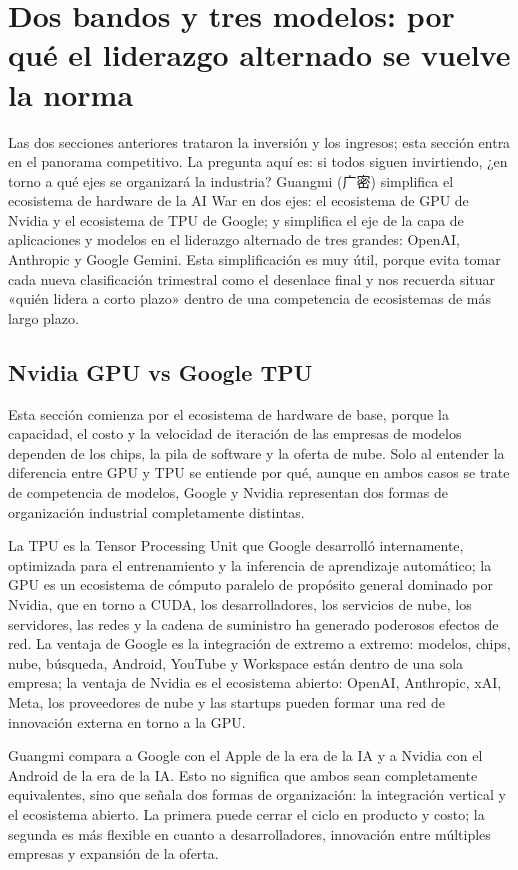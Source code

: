 \section{Dos bandos y tres modelos: por qué el liderazgo alternado se vuelve la norma}

Las dos secciones anteriores trataron la inversión y los ingresos; esta sección entra en el panorama competitivo. La pregunta aquí es: si todos siguen invirtiendo, ¿en torno a qué ejes se organizará la industria? Guangmi (广密) simplifica el ecosistema de hardware de la AI War en dos ejes: el ecosistema de GPU de Nvidia y el ecosistema de TPU de Google; y simplifica el eje de la capa de aplicaciones y modelos en el liderazgo alternado de tres grandes: OpenAI, Anthropic y Google Gemini. Esta simplificación es muy útil, porque evita tomar cada nueva clasificación trimestral como el desenlace final y nos recuerda situar «quién lidera a corto plazo» dentro de una competencia de ecosistemas de más largo plazo.

\subsection{Nvidia GPU vs Google TPU}

Esta sección comienza por el ecosistema de hardware de base, porque la capacidad, el costo y la velocidad de iteración de las empresas de modelos dependen de los chips, la pila de software y la oferta de nube. Solo al entender la diferencia entre GPU y TPU se entiende por qué, aunque en ambos casos se trate de competencia de modelos, Google y Nvidia representan dos formas de organización industrial completamente distintas.

La TPU es la Tensor Processing Unit que Google desarrolló internamente, optimizada para el entrenamiento y la inferencia de aprendizaje automático; la GPU es un ecosistema de cómputo paralelo de propósito general dominado por Nvidia, que en torno a CUDA, los desarrolladores, los servicios de nube, los servidores, las redes y la cadena de suministro ha generado poderosos efectos de red. La ventaja de Google es la integración de extremo a extremo: modelos, chips, nube, búsqueda, Android, YouTube y Workspace están dentro de una sola empresa; la ventaja de Nvidia es el ecosistema abierto: OpenAI, Anthropic, xAI, Meta, los proveedores de nube y las startups pueden formar una red de innovación externa en torno a la GPU.

Guangmi compara a Google con el Apple de la era de la IA y a Nvidia con el Android de la era de la IA. Esto no significa que ambos sean completamente equivalentes, sino que señala dos formas de organización: la integración vertical y el ecosistema abierto. La primera puede cerrar el ciclo en producto y costo; la segunda es más flexible en cuanto a desarrolladores, innovación entre múltiples empresas y expansión de la oferta.

